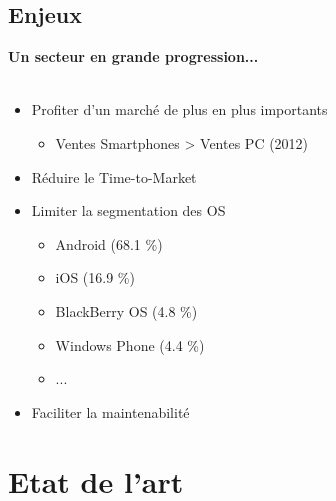 \documentclass{beamer}
\begin{document}
\subsection{Enjeux}
\begin{frame}
\textbf{Un secteur en grande progression...}
\\ ~ \\
  \begin{itemize}
    \item Profiter d'un marché de plus en plus importants
    \begin{itemize}
      \item Ventes Smartphones > Ventes PC (2012)
    \end{itemize}
    \item Réduire le Time-to-Market
    \item Limiter la segmentation des OS
    \begin{itemize}
      \item Android (68.1 \%)
      \item iOS (16.9 \%)
      \item BlackBerry OS (4.8 \%)
      \item Windows Phone (4.4 \%)
      \item ...
    \end{itemize}
    \item Faciliter la maintenabilité
  \end{itemize}
\end{frame}


\section{Etat de l'art}
\begin{frame}
\setcounter{tocdepth}{2}
\tableofcontents[currentsection]
\end{frame}
\end{document}
